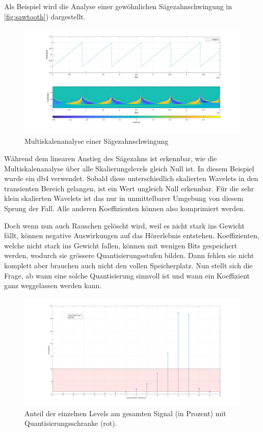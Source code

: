 \begin{refsection}
Als Beispiel wird die Analyse einer gewöhnlichen Sägezahnschwingung in \autoref{fig:sawtooth}) dargestellt.
\begin{figure}
	\centering
	\includegraphics[width=\linewidth]{papers/compress/Bilder/sawtooth}
	\caption{Multiskalenanalyse einer Sägezahnschwingung}
	\label{fig:sawtooth}
\end{figure}
Während dem linearen Anstieg des Sägezahns ist erkennbar, wie die Multiskalenanalyse über alle Skalierungslevels gleich Null ist.
In diesem Beispiel wurde ein db4 verwendet.
Sobald diese unterschiedlich skalierten Wavelets in den transienten Bereich gelangen, ist ein Wert ungleich Null erkennbar.
Für die sehr klein skalierten Wavelets ist das nur in unmittelbarer Umgebung von diesem Sprung der Fall.
Alle anderen Koeffizienten können also komprimiert werden.

Doch wenn nun auch Rauschen gelöscht wird, weil es nicht stark ins Gewicht fällt, können negative Auswirkungen auf das Hörerlebnis entstehen. 
Koeffizienten, welche nicht stark ins Gewicht fallen, können mit wenigen Bits gespeichert werden, wodurch sie grössere Quantisierungsstufen bilden. 
Dann fehlen sie nicht komplett aber brauchen auch nicht den vollen Speicherplatz.
Nun stellt sich die Frage, ab wann eine solche Quantisierung sinnvoll ist und wann ein Koeffizient ganz weggelassen werden kann. 

\begin{figure}
	\centering
	\includegraphics[width=\linewidth]{papers/compress/Bilder/recCoefs}
	\caption{Anteil der einzelnen Levels am gesamten Signal (in Prozent) mit Quantisierungsschranke (rot).}
	\label{fig:coefficients}
\end{figure} 


\end{refsection}
